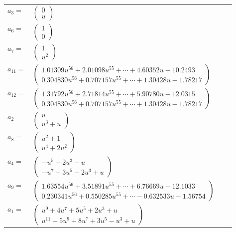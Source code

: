 \documentclass[1p]{elsarticle_modified}
\theoremstyle{definition}
\begin{document}
\begin{tabular}{m{7pt} m{180pt} m{7pt} m{180pt} }
\flushright $a_{3}=$&$\begin{pmatrix}0\\u\end{pmatrix}$ \\
\flushright $a_{6}=$&$\begin{pmatrix}1\\0\end{pmatrix}$ \\
\flushright $a_{7}=$&$\begin{pmatrix}1\\u^2\end{pmatrix}$ \\
\flushright $a_{11}=$&$\begin{pmatrix}1.01309 u^{56}+2.01098 u^{55}+\cdots+4.60352 u-10.2493\\0.304830 u^{56}+0.707157 u^{55}+\cdots+1.30428 u-1.78217\end{pmatrix}$ \\
\flushright $a_{12}=$&$\begin{pmatrix}1.31792 u^{56}+2.71814 u^{55}+\cdots+5.90780 u-12.0315\\0.304830 u^{56}+0.707157 u^{55}+\cdots+1.30428 u-1.78217\end{pmatrix}$ \\
\flushright $a_{2}=$&$\begin{pmatrix}u\\u^3+u\end{pmatrix}$ \\
\flushright $a_{8}=$&$\begin{pmatrix}u^2+1\\u^4+2 u^2\end{pmatrix}$ \\
\flushright $a_{4}=$&$\begin{pmatrix}- u^5-2 u^3- u\\- u^7-3 u^5-2 u^3+u\end{pmatrix}$ \\
\flushright $a_{9}=$&$\begin{pmatrix}1.63554 u^{56}+3.51891 u^{55}+\cdots+6.76669 u-12.1033\\0.230341 u^{56}+0.550285 u^{55}+\cdots-0.632533 u-1.56754\end{pmatrix}$ \\
\flushright $a_{1}=$&$\begin{pmatrix}u^9+4 u^7+5 u^5+2 u^3+u\\u^{11}+5 u^9+8 u^7+3 u^5- u^3+u\end{pmatrix}$ \\

\end{tabular}
\end{document}
